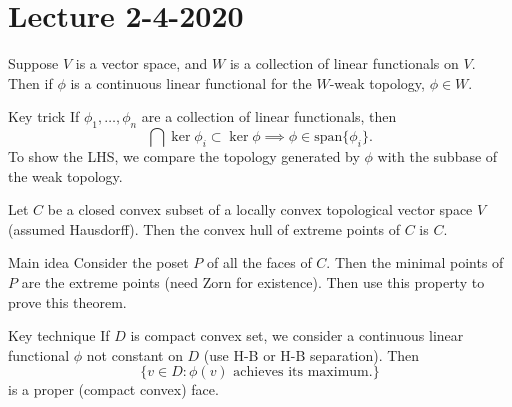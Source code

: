 \section{Lecture 2-4-2020}
\begin{thm}
    Suppose $V$ is a vector space, and $W$ is a collection of linear functionals on $V$. Then if $\phi$ is a continuous linear functional for the $W$-weak topology, $\phi \in W$.
\end{thm}
\begin{details}{Key trick}
If $\phi_1, \dots, \phi_n$ are a collection of linear functionals, then
\[
    \bigcap \ker \phi_i \subset \ker \phi \implies \phi \in \text{span}\{\phi_i\}.
\]
To show the LHS, we compare the topology generated by $\phi$ with the subbase of the weak topology.
\end{details}

\begin{thm}
Let $C$ be a closed convex subset of a locally convex topological vector space $V$ (assumed Hausdorff). Then the convex hull of extreme points of $C$ is $C$.
\end{thm}

\begin{details}{Main idea}
Consider the poset $P$ of all the faces of $C$. Then the minimal points of $P$ are the extreme points (need Zorn for existence). Then use this property to prove this theorem.
\end{details}

\begin{details}{Key technique}
If $D$ is compact convex set, we consider a continuous linear functional $\phi$ not constant on $D$ (use H-B or H-B separation). Then
\[
    \{v \in D: \phi(v) \text{ achieves its maximum.} \}
\]
is a proper (compact convex) face.
\end{details}
